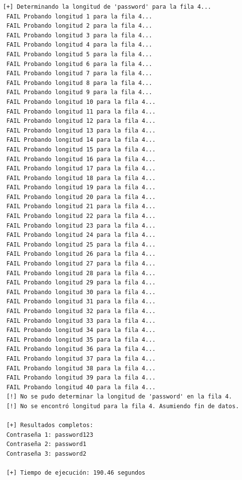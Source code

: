 \documentclass[a4paper,12pt]{article}
\begin{document}
\begin{lstlisting}[style=console, basicstyle=\ttfamily\footnotesize]
 [+] Determinando la longitud de 'password' para la fila 4...
 FAIL Probando longitud 1 para la fila 4...
 FAIL Probando longitud 2 para la fila 4...
 FAIL Probando longitud 3 para la fila 4...
 FAIL Probando longitud 4 para la fila 4...
 FAIL Probando longitud 5 para la fila 4...
 FAIL Probando longitud 6 para la fila 4...
 FAIL Probando longitud 7 para la fila 4...
 FAIL Probando longitud 8 para la fila 4...
 FAIL Probando longitud 9 para la fila 4...
 FAIL Probando longitud 10 para la fila 4...
 FAIL Probando longitud 11 para la fila 4...
 FAIL Probando longitud 12 para la fila 4...
 FAIL Probando longitud 13 para la fila 4...
 FAIL Probando longitud 14 para la fila 4...
 FAIL Probando longitud 15 para la fila 4...
 FAIL Probando longitud 16 para la fila 4...
 FAIL Probando longitud 17 para la fila 4...
 FAIL Probando longitud 18 para la fila 4...
 FAIL Probando longitud 19 para la fila 4...
 FAIL Probando longitud 20 para la fila 4...
 FAIL Probando longitud 21 para la fila 4...
 FAIL Probando longitud 22 para la fila 4...
 FAIL Probando longitud 23 para la fila 4...
 FAIL Probando longitud 24 para la fila 4...
 FAIL Probando longitud 25 para la fila 4...
 FAIL Probando longitud 26 para la fila 4...
 FAIL Probando longitud 27 para la fila 4...
 FAIL Probando longitud 28 para la fila 4...
 FAIL Probando longitud 29 para la fila 4...
 FAIL Probando longitud 30 para la fila 4...
 FAIL Probando longitud 31 para la fila 4...
 FAIL Probando longitud 32 para la fila 4...
 FAIL Probando longitud 33 para la fila 4...
 FAIL Probando longitud 34 para la fila 4...
 FAIL Probando longitud 35 para la fila 4...
 FAIL Probando longitud 36 para la fila 4...
 FAIL Probando longitud 37 para la fila 4...
 FAIL Probando longitud 38 para la fila 4...
 FAIL Probando longitud 39 para la fila 4...
 FAIL Probando longitud 40 para la fila 4...
 [!] No se pudo determinar la longitud de 'password' en la fila 4.
 [!] No se encontró longitud para la fila 4. Asumiendo fin de datos.
 
 [+] Resultados completos:
 Contraseña 1: password123
 Contraseña 2: password1
 Contraseña 3: password2
 
 [+] Tiempo de ejecución: 190.46 segundos 
\end{lstlisting}



\end{document}
